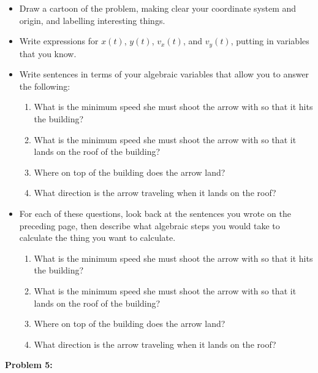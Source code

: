 \documentclass[12pt]{article}
\begin{document}
\begin{itemize}

\item Draw a cartoon of the problem, making clear your coordinate system and origin, and labelling interesting
things.

\vspace{1.2in}

\item Write expressions for $x(t)$, $y(t)$, $v_x(t)$, and $v_y(t)$, putting in variables that you know.

\vspace{1.2in}

\item Write sentences in terms of your algebraic variables that allow you to answer the following:

\begin{enumerate}
\item What is the minimum speed she must shoot the arrow with so that it hits the building? 
\vspace{0.7in}
\item What is the minimum speed she must shoot the arrow with so that it lands on the roof of the building?
\vspace{0.7in}
\item Where on top of the building does the arrow land?
\vspace{0.7in}
\item What direction is the arrow traveling when it lands on the roof?
\end{enumerate}

\newpage

\item For each of these questions, look back at the sentences you wrote on the preceding page, then describe what algebraic steps you would take to calculate the thing you want to calculate.


\begin{enumerate}
	\item What is the minimum speed she must shoot the arrow with so that it hits the building? 
	\vspace{1.7in}
	\item What is the minimum speed she must shoot the arrow with so that it lands on the roof of the building?
	\vspace{1.7in}
	\item Where on top of the building does the arrow land?
	\vspace{1.7in}
	\item What direction is the arrow traveling when it lands on the roof?
\end{enumerate}


\end{itemize}
\newpage
{\large \bf Problem 5:}
\end{document}

